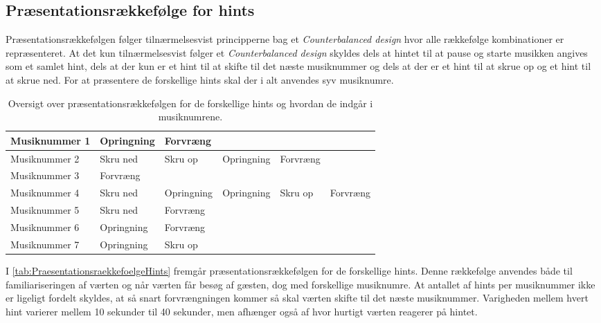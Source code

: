 \subsection{Præsentationsrækkefølge for hints}
\label{PraesentationsraekkefoelgeSocialAccept}
%
Præsentationsrækkefølgen følger tilnærmelsesvist principperne bag et \textit{Counterbalanced design} hvor alle rækkefølge kombinationer er repræsenteret. At det kun tilnærmelsesvist følger et \textit{Counterbalanced design} skyldes dels at hintet til at pause og starte musikken angives som et samlet hint, dels at der kun er et hint til at skifte til det næste musiknummer og dels at der er et hint til at skrue op og et hint til at skrue ned. For at præsentere de forskellige hints skal der i alt anvendes syv musiknumre.
%
\begin{table}[H]
	\centering
	\begin{tabular}{ | p{2.8cm}| p{1.85cm}| p{1.85cm} | p{1.85cm} | p{1.85cm} | p{1.85cm}|}
		\hline
		Musiknummer 1 & Opringning & Forvræng & & & \\ \hline
		Musiknummer 2 & Skru ned & Skru op & Opringning & Forvræng & \\ \hline
		Musiknummer 3 & Forvræng & & & &  \\ \hline
		Musiknummer 4 & Skru ned & Opringning & Opringning & Skru op & Forvræng\\ \hline
		Musiknummer 5 & Skru ned & Forvræng & & & \\ \hline
		Musiknummer 6 & Opringning & Forvræng & & & \\ \hline
		Musiknummer 7 & Opringning & Skru op & & & \\ \hline
	\end{tabular}
	\caption{Oversigt over præsentationsrækkefølgen for de forskellige hints og hvordan de indgår i musiknumrene.}
	\label{tab:PraesentationsraekkefoelgeHints}
\end{table}
\noindent
%
I \autoref{tab:PraesentationsraekkefoelgeHints} fremgår præsentationsrækkefølgen for de forskellige hints. Denne rækkefølge anvendes både til familiariseringen af værten og når værten får besøg af gæsten, dog med forskellige musiknumre. At antallet af hints per musiknummer ikke er ligeligt fordelt skyldes, at så snart forvrængningen kommer så skal værten skifte til det næste musiknummer. Varigheden mellem hvert hint varierer mellem 10 sekunder til 40 sekunder, men afhænger også af hvor hurtigt værten reagerer på hintet.  

